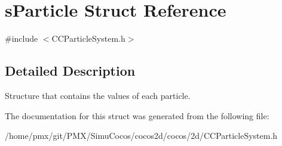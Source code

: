 \hypertarget{structsParticle}{}\section{s\+Particle Struct Reference}
\label{structsParticle}


{\ttfamily \#include $<$C\+C\+Particle\+System.\+h$>$}



\subsection{Detailed Description}
Structure that contains the values of each particle. 

The documentation for this struct was generated from the following file\+:\begin{DoxyCompactItemize}
\item 
/home/pmx/git/\+P\+M\+X/\+Simu\+Cocos/cocos2d/cocos/2d/C\+C\+Particle\+System.\+h\end{DoxyCompactItemize}
